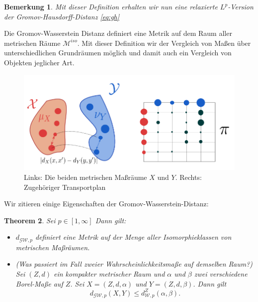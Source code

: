 \documentclass[11pt,a4paper]{article}
\newtheorem{theorem}{Theorem}[subsection]
\newtheorem{remark}[theorem]{Bemerkung}
\numberwithin{equation}{section}
\begin{document}
	\begin{remark}
		Mit dieser Definition erhalten wir nun eine relaxierte $L^p$-Version der Gromov-Hausdorff-Distanz \autoref{eq:gh}
	\end{remark}
	Die Gromov-Wasserstein Distanz definiert eine Metrik auf dem Raum aller metrischen Räume $\mathcal{M}^{iso}$. 
	Mit dieser Definition wir der Vergleich von Maßen über unterschiedlichen Grundräumen möglich und damit auch ein Vergleich von Objekten jeglicher Art.
	
	\begin{figure}[h]
		\begin{center}
			\includegraphics[width=0.3\textheight]{gwd_Transportplan.png}
			\caption[Beispiel der Gromov-Wasserstein-Distanz]{Links: Die beiden metrischen Maßräume $X$ und $Y$. Rechts: Zugehöriger Transportplan}
		\end{center}
	\end{figure}
	
	Wir zitieren einige Eigenschaften der Gromov-Wasserstein-Distanz:
	
	\begin{theorem}\cite[Thm. 5.1]{memoli2011gromov} Sei $p \in [1, \infty]$ Dann gilt:
		\begin{itemize}
			\item[(a)] $d_{\mathcal{GW},p}$ definiert eine Metrik auf der Menge aller Isomorphieklassen von metrischen Maßräumen. 
			\item[(b)] (Was passiert im Fall zweier Wahrscheinlichkeitsmaße auf demselben Raum?) Sei $(Z,d)$ ein kompakter metrischer Raum und $\alpha$ und $\beta$ zwei verschiedene Borel-Maße auf $Z$. Sei $X=(Z,d,\alpha)$ und $Y=(Z,d,\beta)$. Dann gilt
			\begin{equation}
			d_{\mathcal{GW},p}(X,Y) \leq d_{\mathcal{W},p}^Z(\alpha,\beta).
			\end{equation}
		\end{itemize}
		
	\end{theorem}
	
\end{document}
